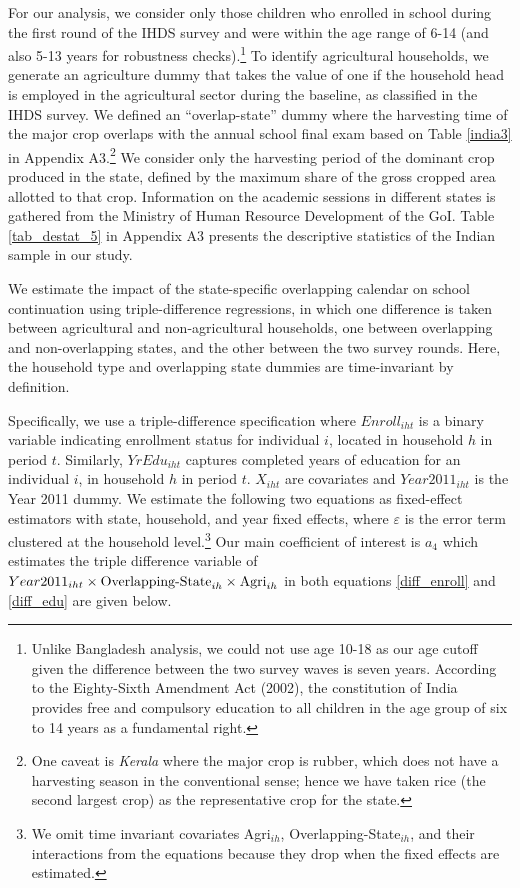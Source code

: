 \documentclass[12pt,letterpaper]{article}
\newcommand{\0}{\ensuremath{\mbox{\boldmath $0$}}}
\begin{document}
For our analysis, we consider only those children who enrolled in school during the first round of the IHDS survey and were within the age range of 6-14 (and also 5-13 years for robustness checks).\footnote{Unlike Bangladesh analysis, we could not use age 10-18 as our age cutoff given the difference between the two survey waves is seven years. According to the Eighty-Sixth Amendment Act (2002), the constitution of India provides free and compulsory education to all children in the age group of six to 14 years as a fundamental right.} To identify agricultural households, we generate an agriculture dummy that takes the value of one if the household head is employed in the agricultural sector during the baseline, as classified in the IHDS survey.  We defined an ``overlap-state'' dummy where the harvesting time of the major crop overlaps with the annual school final exam based on Table \ref{india3} in Appendix A3.\footnote{One caveat is \textit{Kerala} where the major crop is rubber, which does not have a harvesting season in the conventional sense; hence we have taken rice (the second largest crop) as the representative crop for the state.} We consider only the harvesting period of the dominant crop produced in the state, defined by the maximum share of the gross cropped area allotted to that crop. Information on the academic sessions in different states is gathered from the Ministry of Human Resource Development of the GoI. Table \ref{tab_destat_5} in Appendix A3 presents the descriptive statistics of the Indian sample in our study.

We estimate the impact of the state-specific overlapping calendar on school continuation using triple-difference regressions, in which one difference is taken between agricultural and non-agricultural households, one between overlapping and non-overlapping states, and the other between the two survey rounds. Here, the household type and overlapping state dummies are time-invariant by definition.

Specifically, we use a triple-difference specification where ${Enroll}_{iht}$ is a binary variable indicating enrollment status for individual $i$, located in household $h$ in period $t$. Similarly, ${YrEdu}_{iht}$ captures completed years of education for an individual $i$, in household $h$ in period $t$. ${X}_{iht}$ are covariates and ${Year2011}_{iht}$ is the Year 2011 dummy. We estimate the following two equations as fixed-effect estimators with state, household, and year fixed effects, where $\varepsilon$ is the error term clustered at the household level.\footnote{We omit time invariant covariates Agri$_{ih}$, Overlapping-State$_{ih}$, and their interactions from the equations because they drop when the fixed effects are estimated. } Our main coefficient of interest is $a_4$ which estimates the triple difference variable of ${Year2011}_{iht}\times \textnormal{Overlapping-State}_{ih}\times\textnormal{Agri}_{ih}$ in both equations \ref{diff_enroll} and \ref{diff_edu} are given below.
\end{document}
